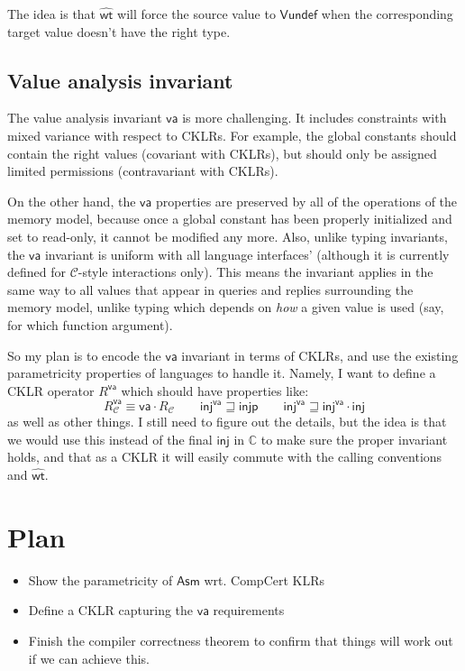 \documentclass[11pt]{article}
\begin{document}
The idea is that $\hat{\mathsf{wt}}$
will force the source value to $\mathsf{Vundef}$
when the corresponding target value
doesn't have the right type.

\subsection{Value analysis invariant}

The value analysis invariant $\mathsf{va}$
is more challenging.
It includes constraints with mixed variance
with respect to CKLRs.
For example,
the global constants should contain the right values
(covariant with CKLRs),
but should only be assigned limited permissions
(contravariant with CKLRs).

On the other hand,
the $\mathsf{va}$ properties
are preserved by all of the operations of the memory model,
because once a global constant has been properly initialized
and set to read-only,
it cannot be modified any more.
Also,
unlike typing invariants,
the $\mathsf{va}$ invariant is uniform
with all language interfaces'
(although it is currently defined for $\mathcal{C}$-style interactions only).
This means the invariant applies in the same way
to all values that appear in queries and replies
surrounding the memory model,
unlike typing which depends on \emph{how} a given value is used
(say, for which function argument).

So my plan is to encode the $\mathsf{va}$
invariant in terms of CKLRs,
and use the existing parametricity properties of languages
to handle it.
Namely, I want to define a CKLR operator $R^\mathsf{va}$
which should have properties like:
\[
  R^\mathsf{va}_\mathcal{\!C} \equiv \mathsf{va} \cdot R_\mathcal{\!C}
  \qquad
  \mathsf{inj}^\mathsf{va} \sqsupseteq \mathsf{injp}
  \qquad
  \mathsf{inj}^\mathsf{va} \sqsupseteq \mathsf{inj}^\mathsf{va} \cdot \mathsf{inj}
\]
as well as other things.
I still need to figure out the details,
but the idea is that we would use this instead of the final $\mathsf{inj}$
in $\mathbb{C}$ to make sure the proper invariant holds,
and that as a CKLR it will easily commute with the calling conventions
and $\hat{\mathsf{wt}}$.

\section{Plan}

\begin{itemize}
  \item Show the parametricity of $\mathsf{Asm}$ wrt. CompCert KLRs
  \item Define a CKLR capturing the $\mathsf{va}$ requirements
  \item Finish the compiler correctness theorem
    to confirm that things will work out if we can achieve this.
\end{itemize}
\end{document}
